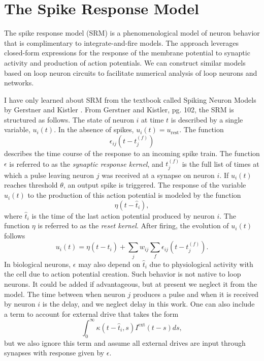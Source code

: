 \documentclass[]{article}
\begin{document}
\section{\label{sec:spike_response_model}The Spike Response Model}
The spike response model (SRM) is a phenomenological model of neuron behavior that is complimentary to integrate-and-fire models. The approach leverages closed-form expressions for the response of the membrane potential to synaptic activity and production of action potentials. We can construct similar models based on loop neuron circuits to facilitate numerical analysis of loop neurons and networks.

I have only learned about SRM from the textbook called Spiking Neuron Models by Gerstner and Kistler \cite{geki2002}. From Gerstner and Kistler, pg. 102, the SRM is structured as follows. The state of neuron $i$ at time $t$ is described by a single variable, $u_i(t)$. In the absence of spikes, $u_i(t) = u_{\mathrm{rest}}$. The function
\begin{equation}
\label{eq:synaptic_response_kernel}
\epsilon_{ij}(t-t_j^{(f)})
\end{equation}
describes the time course of the response to an incoming spike train. The function $\epsilon$ is referred to as the \textit{synaptic response kernel}, and $t_j^{(f)}$ is the full list of times at which a pulse leaving neuron $j$ was received at a synapse on neuron $i$. If $u_i(t)$ reaches threshold $\theta$, an output spike is triggered. The response of the variable $u_i(t)$ to the production of this action potential is modeled by the function
\begin{equation}
\label{eq:reset_kernel}
\eta(t-\hat{t}_i),
\end{equation}
where $\hat{t}_i$ is the time of the last action potential produced by neuron $i$. The function $\eta$ is referred to as the \textit{reset kernel}. After firing, the evolution of $u_i(t)$ follows
\begin{equation}
\label{eq:spike_response_model}
u_i(t) = \eta(t-\hat{t}_i)+\sum_j w_{ij}\sum_f \epsilon_{ij}(t-t_j^{(f)}).
\end{equation}
In biological neurons, $\epsilon$ may also depend on $\hat{t}_i$ due to physiological activity with the cell due to action potential creation. Such behavior is not native to loop neurons. It could be added if advantageous, but at present we neglect it from the model. The time between when neuron $j$ produces a pulse and when it is received by neuron $i$ is the delay, and we neglect delay in this work. One can also include a term to account for external drive that takes the form
\begin{equation}
\label{eq:external_drive}
\int_0^{\infty}\kappa(t-\hat{t}_i,s)I^{\mathrm{ext}}(t-s)ds,
\end{equation}
but we also ignore this term and assume all external drives are input through synapses with response given by $\epsilon$.
\end{document}
